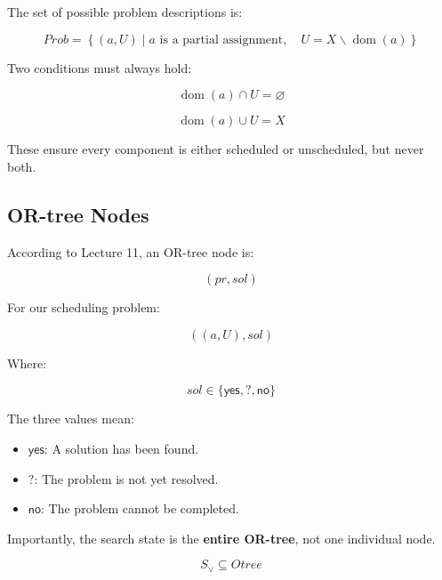 \documentclass[11pt,letterpaper]{article}
\newcommand{\setminusop}{\mathbin{\backslash}}
\newcommand{\yes}{\mathsf{yes}}
\newcommand{\no}{\mathsf{no}}
\newcommand{\ask}{\mathord{?}}
\newcommand{\dom}{\operatorname{dom}}
\newcommand{\Prob}{\mathit{Prob}}
\begin{document}
The set of possible problem descriptions is:

\begin{equation}
\boxed{
\Prob=
\left\{
(a,U)\mid
a\text{ is a partial assignment},
\quad
U=X\setminusop\dom(a)
\right\}
}
\end{equation}

Two conditions must always hold:

\begin{equation}
\boxed{
\dom(a)\cap U=\varnothing
}
\end{equation}

\begin{equation}
\boxed{
\dom(a)\cup U=X
}
\end{equation}

These ensure every component is either
scheduled or unscheduled, but never both.

\subsection{OR-tree Nodes}

According to Lecture 11, an OR-tree node is:

\begin{equation}
\boxed{
(pr,sol)
}
\end{equation}

For our scheduling problem:

\begin{equation}
\boxed{
((a,U),sol)
}
\end{equation}

Where:

\begin{equation}
sol\in\{\yes,\ask,\no\}
\end{equation}

The three values mean:

\begin{itemize}
    \item $\yes$: A solution has been found.
    \item $\ask$: The problem is not yet resolved.
    \item $\no$: The problem cannot be completed.
\end{itemize}

Importantly, the search state is the
\textbf{entire OR-tree}, not one individual node.

\begin{equation}
\boxed{
S_{\lor}\subseteq Otree
}
\end{equation}
\end{document}
